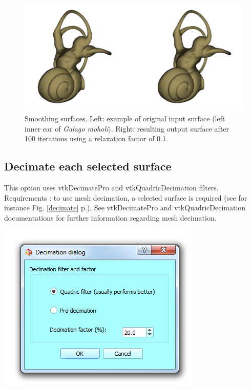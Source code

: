 \begin{figure}
  \centering
  \includegraphics[scale=0.35]{images/09/structure/surface_smoothing_example.png} 
	\caption{Smoothing surfaces. Left: example of original input surface (left inner ear of \textit{Galago moholi}). Right: resulting output surface after 100 iterations using a relaxation factor of 0.1.}
\label{smooth}
 
\end{figure}





\subsection{Decimate each selected surface}
\noindent
\begin{minipage}{0.5\textwidth}


This option uses vtkDecimatePro and vtkQuadricDecimation filters. Requirements : to use mesh decimation, a selected
surface is required (see for instance Fig. \ref{decimate} p.\pageref{decimate}). See vtkDecimatePro and vtkQuadricDecimation documentations for further information regarding
mesh decimation.

\end{minipage}    
\begin{minipage}{0.5\textwidth}\centering
  \includegraphics[scale=0.5]{images/09/structure/decimation_dialog.png}
 \end{minipage} 
\noindent

